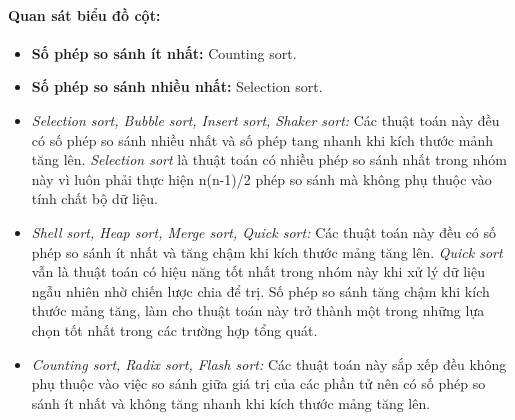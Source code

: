     \paragraph{Quan sát biểu đồ cột:}
    \begin{itemize}
        \item \textbf{Số phép so sánh ít nhất:} Counting sort.
        \item \textbf{Số phép so sánh nhiều nhất:} Selection sort.
        \item \textit{Selection sort, Bubble sort, Insert sort, Shaker sort:} Các thuật toán này đều có số phép so sánh nhiều nhất và số phép tang nhanh khi kích thước mảnh tăng lên. \textit{Selection sort} là thuật toán có nhiều phép so sánh nhất trong nhóm này vì luôn phải thực hiện n(n-1)/2 phép so sánh mà không phụ thuộc vào tính chất bộ dữ liệu.
        \item \textit{Shell sort, Heap sort, Merge sort, Quick sort:} Các thuật toán này đều có số phép so sánh ít nhất và tăng chậm khi kích thước mảng tăng lên. \textit{Quick sort} vẫn là thuật toán có hiệu năng tốt nhất trong nhóm này  khi xử lý dữ liệu ngẫu nhiên nhờ chiến lược chia để trị. Số phép so sánh tăng chậm khi kích thước mảng tăng, làm cho thuật toán này trở thành một trong những lựa chọn tốt nhất trong các trường hợp tổng quát.
        \item \textit{Counting sort, Radix sort, Flash sort:} Các thuật toán này sắp xếp đều không phụ thuộc vào việc so sánh giữa giá trị của các phần tử nên có số phép so sánh ít nhất và không tăng nhanh khi kích thước mảng tăng lên.
    \end{itemize}
\newpage
